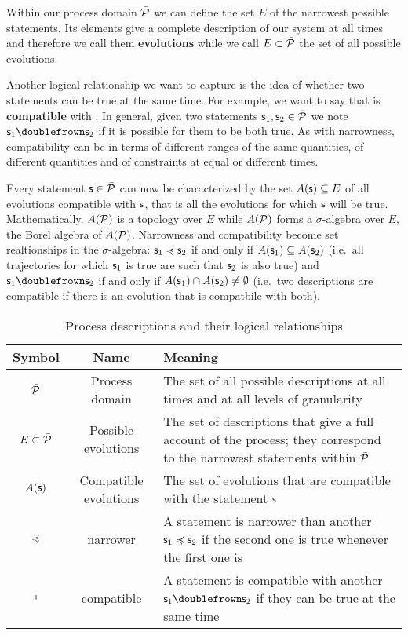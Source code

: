 \documentclass[letterpaper]{article}
\begin{document}
Within our process domain $\tdomain[P]$ we can define the set $E$ of the narrowest possible statements. Its elements give a complete description of our system at all times and therefore we call them \textbf{evolutions} while we call $E \subset \tdomain[P]$ the set of all possible evolutions.

Another logical relationship we want to capture is the idea of whether two statements can be true at the same time. For example, we want to say that  is \textbf{compatible} with . In general, given two statements $\stmt_1, \stmt_2 \in \tdomain[P]$ we note $\stmt_1 \comp \stmt_2$ if it is possible for them to be both true. As with narrowness, compatibility can be in terms of different ranges of the same quantities, of different quantities and of constraints at equal or different times.

Every statement $\stmt \in \tdomain[P]$ can now be characterized by the set $A(\stmt) \subseteq E$ of all evolutions compatible with $\stmt$, that is all the evolutions for which $\stmt$ will be true. Mathematically,  $A(\edomain[P])$ is a topology over $E$ while $A(\tdomain[P])$ forms a $\sigma$-algebra over $E$, the Borel algebra of $A(\edomain[P])$. Narrowness and compatibility become set realtionships in the $\sigma$-algebra: $\stmt_1 \narrower \stmt_2$ if and only if $A(\stmt_1) \subseteq A(\stmt_2)$ (i.e.~all trajectories for which $\stmt_1$ is true are such that $\stmt_2$ is also true) and $\stmt_1 \comp \stmt_2$ if and only if $A(\stmt_1) \cap A(\stmt_2) \neq \emptyset$ (i.e.~two descriptions are compatible if there is an evolution that is compatbile with both).

\begin{table}[h!]
	\centering
\begin{tabular}[h]{|c|c|p{6cm}|}
	\hline 
	Symbol & Name & Meaning \\ 
	\hline 
	$\tdomain[P]$ & Process domain & The set of all possible descriptions at all times and at all levels of granularity \\ 
	\hline 
	$E \subset \tdomain[P]$ & Possible evolutions & The set of descriptions that give a full account of the process; they correspond to the narrowest statements within $\tdomain[P]$ \\ 
	\hline 
	$A(\stmt)$ & Compatible evolutions & The set of evolutions that are compatible with the statement $\stmt$ \\ 
	\hline 
	$\narrower$ & narrower & A statement is narrower than another $\stmt_1 \narrower \stmt_2$ if the second one is true whenever the first one is \\ 
	\hline 
	$\comp$ & compatible & A statement is compatible with another $\stmt_1 \comp \stmt_2$ if they can be true at the same time \\ 
	\hline 
\end{tabular} 
	\caption{Process descriptions and their logical relationships}
	\label{table:logic}
\end{table}
\end{document}
